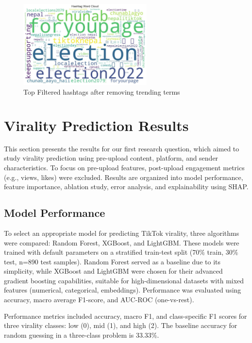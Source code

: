 \documentclass[12pt,a4paper]{report}
\begin{document}
\begin{figure}[htbp]
\centering
\includegraphics[width=0.60\textwidth]{figures/EDA/wordcloud.jpg}
\caption{Top Filtered hashtags after removing trending terms}
\label{fig:wordcloud}
\end{figure}

\clearpage
\section{Virality Prediction Results}
This section presents the results for our first research question, which aimed to study virality prediction using pre-upload content, platform, and sender characteristics. To focus on pre-upload features, post-upload engagement metrics (e.g., views, likes) were excluded. Results are organized into model performance, feature importance, ablation study, error analysis, and explainability using SHAP.


\subsection{Model Performance}
\label{sec:model_selection}
To select an appropriate model for predicting TikTok virality, three algorithms were compared: Random Forest, XGBoost, and LightGBM. These models were trained with default parameters on a stratified train-test split (70\% train, 30\% test, n=890 test samples). Random Forest served as a baseline due to its simplicity, while XGBoost and LightGBM were chosen for their advanced gradient boosting capabilities, suitable for high-dimensional datasets with mixed features (numerical, categorical, embeddings). Performance was evaluated using accuracy, macro average F1-score, and AUC-ROC (one-vs-rest).

Performance metrics included accuracy, macro F1, and class-specific F1 scores for three virality classes: low (0), mid (1), and high (2). The baseline accuracy for random guessing in a three-class problem is 33.33\%.
\end{document}
